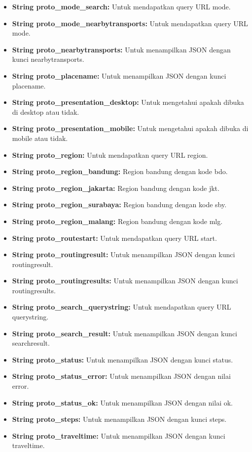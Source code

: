 \begin{enumerate}
\begin{itemize}
		\item \textbf{String proto\_mode\_search:} Untuk mendapatkan query URL mode.
		\item \textbf{String proto\_mode\_nearbytransports:} Untuk mendapatkan query URL mode.
		\item \textbf{String proto\_nearbytransports:} Untuk menampilkan JSON dengan kunci nearbytransports.
		\item \textbf{String proto\_placename:} Untuk menampilkan JSON dengan kunci placename.
		\item \textbf{String proto\_presentation\_desktop:} Untuk mengetahui apakah dibuka di desktop atau tidak.
		\item \textbf{String proto\_presentation\_mobile:} Untuk mengetahui apakah dibuka di mobile atau tidak.
		\item \textbf{String proto\_region:} Untuk mendapatkan query URL region.
		\item \textbf{String proto\_region\_bandung:} Region bandung dengan kode bdo.
		\item \textbf{String proto\_region\_jakarta:} Region bandung dengan kode jkt.
		\item \textbf{String proto\_region\_surabaya:} Region bandung dengan kode sby.
		\item \textbf{String proto\_region\_malang:} Region bandung dengan kode mlg.
		\item \textbf{String proto\_routestart:} Untuk mendapatkan query URL start.
		\item \textbf{String proto\_routingresult:} Untuk menampilkan JSON dengan kunci routingresult.
		\item \textbf{String proto\_routingresults:} Untuk menampilkan JSON dengan kunci routingresults.
		\item \textbf{String proto\_search\_querystring:} Untuk mendapatkan query URL querystring.
		\item \textbf{String proto\_search\_result:} Untuk menampilkan JSON dengan kunci searchresult.
		\item \textbf{String proto\_status:} Untuk menampilkan JSON dengan kunci status.
		\item \textbf{String proto\_status\_error:} Untuk menampilkan JSON dengan nilai error.
		\item \textbf{String proto\_status\_ok:} Untuk menampilkan JSON dengan nilai ok.
		\item \textbf{String proto\_steps:} Untuk menampilkan JSON dengan kunci steps.
		\item \textbf{String proto\_traveltime:} Untuk menampilkan JSON dengan kunci traveltime.

\end{itemize}
\end{enumerate}

